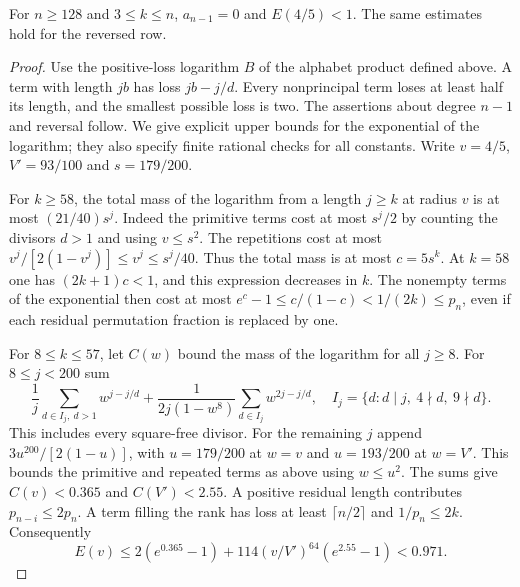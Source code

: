 \begin{lemma}\label{invstrong}
For $n\ge128$ and $3\le k\le n$, $a_{n-1}=0$ and $E(4/5)<1$. The same estimates hold for the reversed row.
\end{lemma}
\begin{proof}
Use the positive-loss logarithm $B$ of the alphabet product defined above. A term with length $jb$ has loss $jb-j/d$. Every nonprincipal term loses at least half its length, and the smallest possible loss is two. The assertions about degree $n-1$ and reversal follow. We give explicit upper bounds for the exponential of the logarithm; they also specify finite rational checks for all constants. Write $v=4/5$, $V'=93/100$ and $s=179/200$.

For $k\ge58$, the total mass of the logarithm from a length $j\ge k$ at radius $v$ is at most $(21/40)s^j$. Indeed the primitive terms cost at most $s^j/2$ by counting the divisors $d>1$ and using $v\le s^2$. The repetitions cost at most $v^j/[2(1-v^j)]\le v^j\le s^j/40$. Thus the total mass is at most $c=5s^k$. At $k=58$ one has $(2k+1)c<1$, and this expression decreases in $k$. The nonempty terms of the exponential then cost at most $e^c-1\le c/(1-c)<1/(2k)\le p_n$, even if each residual permutation fraction is replaced by one.

For $8\le k\le57$, let $C(w)$ bound the mass of the logarithm for all $j\ge8$. For $8\le j<200$ sum
\[
 \frac1j\sum_{d\in I_j,\ d>1} w^{j-j/d}
 +\frac1{2j(1-w^8)}\sum_{d\in I_j} w^{2j-j/d},
 \quad I_j=\{d:d\mid j,\ 4\nmid d,\ 9\nmid d\}.
\]
This includes every square-free divisor. For the remaining $j$ append $3u^{200}/[2(1-u)]$, with $u=179/200$ at $w=v$ and $u=193/200$ at $w=V'$. This bounds the primitive and repeated terms as above using $w\le u^2$. The sums give $C(v)<0.365$ and $C(V')<2.55$. A positive residual length contributes $p_{n-i}\le2p_n$. A term filling the rank has loss at least $\lceil n/2\rceil$ and $1/p_n\le2k$. Consequently
\[
 E(v)\le 2(e^{0.365}-1)+114(v/V')^{64}(e^{2.55}-1)<0.971.
\]


\end{proof}
